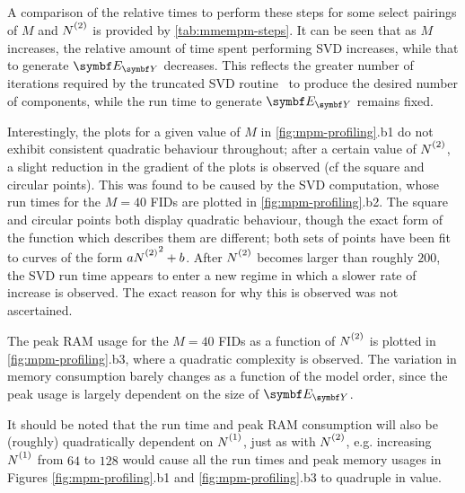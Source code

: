 A comparison of the relative times to perform these steps for some select
pairings of $M$ and $\Ntwo$ is provided by \cref{tab:mmempm-steps}. It can be
seen that as $M$ increases, the relative amount of time spent performing
\ac{SVD} increases, while that to generate $\EY$ decreases. This
reflects the greater number of iterations required by
the truncated \ac{SVD} routine~\cite{svds} to produce the desired number of
components, while the run time to generate $\EY$ remains fixed.

Interestingly, the plots for a given value of $M$ in
\cref{fig:mpm-profiling}.b1 do not exhibit
consistent quadratic behaviour throughout; after a certain value of $\Ntwo$, a
slight reduction in the gradient of the plots is observed (cf
the square and circular points). This was found to be caused by the \ac{SVD}
computation, whose run times for the $M=40$ \acp{FID} are plotted in
\cref{fig:mpm-profiling}.b2.
The square and circular points both display quadratic behaviour, though the
exact form of the function which
describes them are different; both sets of points have been fit to curves of
the form $a\Ntwo^2 + b$. After $\Ntwo$ becomes larger than
roughly $200$, the \ac{SVD} run time appears to enter a new regime in which
a slower rate of increase is observed. The exact reason for why this is
observed was not ascertained.

The peak \ac{RAM} usage for the $M=40$ \acp{FID} as a function of $\Ntwo$ is
plotted in \cref{fig:mpm-profiling}.b3, where a quadratic complexity is
observed. The variation in memory consumption barely changes as a function of
the model order, since the peak usage is largely dependent on the size of
$\EY$.

It should be noted that the run time and peak \ac{RAM} consumption will also be
(roughly) quadratically dependent on $\None$, just as with $\Ntwo$, e.g.
increasing  $\None$ from  $64$ to $128$ would cause all the run times and peak
memory usages in Figures \ref{fig:mpm-profiling}.b1 and
\ref{fig:mpm-profiling}.b3 to quadruple in value.

